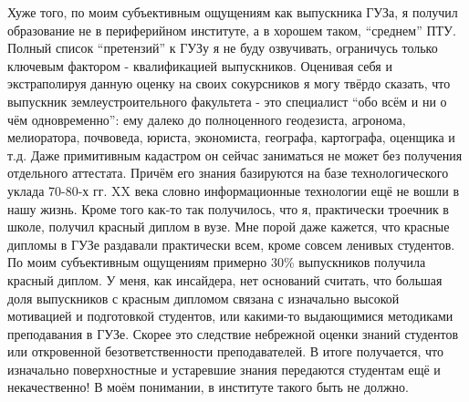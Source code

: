 \begin{drama}
Хуже того, по моим субъективным ощущениям как выпускника ГУЗа, я получил образование не в периферийном институте, а в хорошем таком, “среднем” ПТУ. Полный список “претензий” к ГУЗу я не буду озвучивать, ограничусь только ключевым фактором - квалификацией выпускников. Оценивая себя и экстраполируя данную оценку на своих сокурсников я могу твёрдо сказать, что выпускник землеустроительного факультета - это специалист “обо всём и ни о чём одновременно”: ему далеко до полноценного геодезиста, агронома, мелиоратора, почвоведа, юриста, экономиста, географа, картографа, оценщика и т.д. Даже примитивным кадастром он сейчас заниматься не может без получения отдельного аттестата. Причём его знания базируются на базе технологического уклада 70-80-х гг. XX века словно информационные технологии ещё не вошли в нашу жизнь.  Кроме того как-то так получилось, что я, практически троечник в школе, получил красный диплом в вузе. Мне порой даже кажется, что красные дипломы в ГУЗе раздавали практически всем, кроме совсем ленивых студентов. По моим субъективным ощущениям примерно 30\% выпускников получила красный диплом. У меня, как инсайдера, нет оснований считать, что большая доля выпускников с красным дипломом связана с изначально высокой мотивацией и подготовкой студентов, или какими-то выдающимися методиками преподавания в ГУЗе. Скорее это следствие небрежной оценки знаний студентов или откровенной безответственности преподавателей. В итоге получается, что изначально поверхностные и устаревшие знания передаются студентам ещё и некачественно! В моём понимании, в институте такого быть не должно. 


\end{drama}
